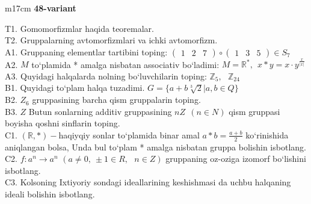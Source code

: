 \documentclass{article}
\begin{document}
\begin{tabular}{m{17cm}}
\textbf{48-variant}
\newline

T1. Gomomorfizmlar haqida teoremalar. \\
T2. Gruppalarning avtomorfizmlari va ichki avtomorfizm. \\
A1. Gruppaning elementlar tartibini toping: \(\begin{pmatrix}
1 & 2 & 7
\end{pmatrix} \circ \begin{pmatrix}
1 & 3 & 5
\end{pmatrix} \in S_{7}\) \\
A2. \(M\) to`plamida * amalga nisbatan associativ bo`ladimi: \(M = \mathbb{R}^{*},\ \ x*y = x \cdot y^{\frac{x}{|x|}}\) \\
A3. Quyidagi halqalarda nolning bo`luvchilarin toping: \(\mathbb{Z}_{5},\ \ \ \mathbb{Z}_{24}\) \\
B1. Quyidagi to`plam halqa tuzadimi. \(G = \{ a + b\sqrt[3]{2}|a,b \in Q\}\) \\
B2. \(Z_{6}\) gruppasining barcha qism gruppalarin toping. \\
B3. \(Z\) Butun sonlarning additiv gruppasining \(nZ\ \ (n \in N)\) qism gruppasi boyisha qo\textquotesingle shni sinflarin toping. \\
C1. \((\mathbb{R},*) -\)haqiyqiy sonlar to`plamida binar amal \(a*b = \frac{a + b}{2}\) ko`rinishida aniqlangan bolsa, Unda bul to`plam * amalga nisbatan gruppa bolishin isbotlang. \\
C2. \(f:a^{n} \rightarrow a^{n}\) \((a \neq 0,\  \pm 1 \in R,\ \ \ n \in Z)\) gruppaning o\textquotesingle z-o\textquotesingle ziga izomorf bo`lishini isbotlang. \\
C3. Kolsoning Ixtiyoriy sondagi ideallarining keshishmasi da uchbu halqaning ideali bo\textquotesingle lishin isbotlang. \\

\end{tabular}
\vspace{1cm}
\end{document}
